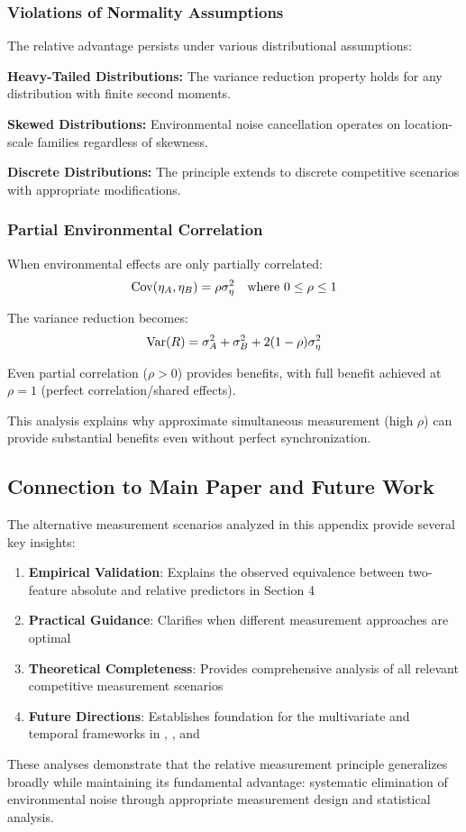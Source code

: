 \subsubsection{Violations of Normality Assumptions}

The relative advantage persists under various distributional assumptions:

\textbf{Heavy-Tailed Distributions:} The variance reduction property holds for any distribution with finite second moments.

\textbf{Skewed Distributions:} Environmental noise cancellation operates on location-scale families regardless of skewness.

\textbf{Discrete Distributions:} The principle extends to discrete competitive scenarios with appropriate modifications.

\subsubsection{Partial Environmental Correlation}

When environmental effects are only partially correlated:
\begin{equation}
\operatorname{Cov}(\eta_A, \eta_B) = \rho \sigma_\eta^2 \quad \text{where } 0 \leq \rho \leq 1
\end{equation}

The variance reduction becomes:
\begin{equation}
\operatorname{Var}(R) = \sigma_A^2 + \sigma_B^2 + 2(1-\rho)\sigma_\eta^2
\end{equation}

Even partial correlation ($\rho > 0$) provides benefits, with full benefit achieved at $\rho = 1$ (perfect correlation/shared effects).

This analysis explains why approximate simultaneous measurement (high $\rho$) can provide substantial benefits even without perfect synchronization.

\subsection{Connection to Main Paper and Future Work}

The alternative measurement scenarios analyzed in this appendix provide several key insights:

\begin{enumerate}
\item \textbf{Empirical Validation}: Explains the observed equivalence between two-feature absolute and relative predictors in Section 4
\item \textbf{Practical Guidance}: Clarifies when different measurement approaches are optimal
\item \textbf{Theoretical Completeness}: Provides comprehensive analysis of all relevant competitive measurement scenarios
\item \textbf{Future Directions}: Establishes foundation for the multivariate and temporal frameworks in \papertwo, \paperthree, and \paperfour
\end{enumerate}

These analyses demonstrate that the relative measurement principle generalizes broadly while maintaining its fundamental advantage: systematic elimination of environmental noise through appropriate measurement design and statistical analysis.